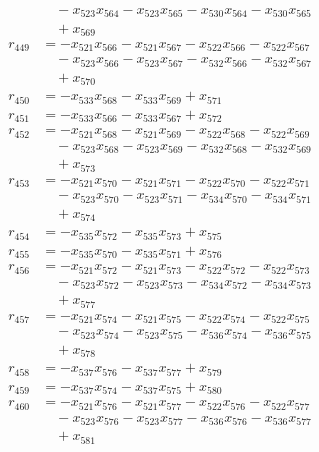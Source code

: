 \begin{align*}
&\quad{}- x_{523} x_{564} - x_{523} x_{565} - x_{530} x_{564} - x_{530} x_{565} \\
&\quad{}+ x_{569} \\
r_{449} &= -x_{521} x_{566} - x_{521} x_{567} - x_{522} x_{566} - x_{522} x_{567} \\
&\quad{}- x_{523} x_{566} - x_{523} x_{567} - x_{532} x_{566} - x_{532} x_{567} \\
&\quad{}+ x_{570} \\
r_{450} &= -x_{533} x_{568} - x_{533} x_{569} + x_{571} \\
r_{451} &= -x_{533} x_{566} - x_{533} x_{567} + x_{572} \\
r_{452} &= -x_{521} x_{568} - x_{521} x_{569} - x_{522} x_{568} - x_{522} x_{569} \\
&\quad{}- x_{523} x_{568} - x_{523} x_{569} - x_{532} x_{568} - x_{532} x_{569} \\
&\quad{}+ x_{573} \\
r_{453} &= -x_{521} x_{570} - x_{521} x_{571} - x_{522} x_{570} - x_{522} x_{571} \\
&\quad{}- x_{523} x_{570} - x_{523} x_{571} - x_{534} x_{570} - x_{534} x_{571} \\
&\quad{}+ x_{574} \\
r_{454} &= -x_{535} x_{572} - x_{535} x_{573} + x_{575} \\
r_{455} &= -x_{535} x_{570} - x_{535} x_{571} + x_{576} \\
r_{456} &= -x_{521} x_{572} - x_{521} x_{573} - x_{522} x_{572} - x_{522} x_{573} \\
&\quad{}- x_{523} x_{572} - x_{523} x_{573} - x_{534} x_{572} - x_{534} x_{573} \\
&\quad{}+ x_{577} \\
r_{457} &= -x_{521} x_{574} - x_{521} x_{575} - x_{522} x_{574} - x_{522} x_{575} \\
&\quad{}- x_{523} x_{574} - x_{523} x_{575} - x_{536} x_{574} - x_{536} x_{575} \\
&\quad{}+ x_{578} \\
r_{458} &= -x_{537} x_{576} - x_{537} x_{577} + x_{579} \\
r_{459} &= -x_{537} x_{574} - x_{537} x_{575} + x_{580} \\
r_{460} &= -x_{521} x_{576} - x_{521} x_{577} - x_{522} x_{576} - x_{522} x_{577} \\
&\quad{}- x_{523} x_{576} - x_{523} x_{577} - x_{536} x_{576} - x_{536} x_{577} \\
&\quad{}+ x_{581} \\

\end{align*}
